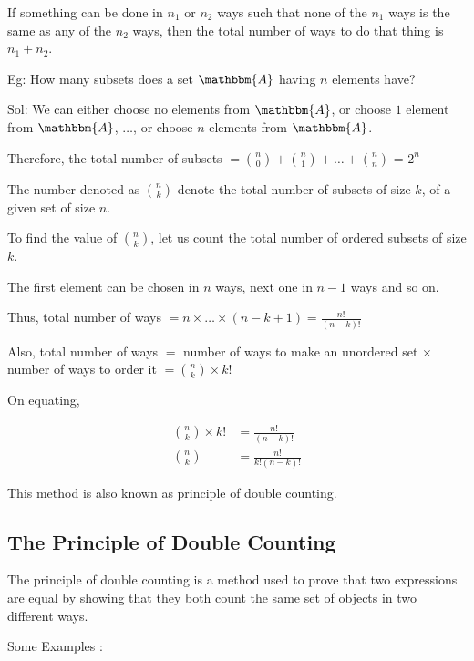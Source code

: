 \documentclass[14pt]{extarticle}
\newcommand{\A}{\mathbbm{A}}
\begin{document}
If something can be done in $n_1$ or $n_2$ ways such that none of the $n_1$ ways is the same as any of the $n_2$ ways, then the total number of ways to do that thing is $n_1 + n_2$.

Eg: How many subsets does a set $\A$ having $n$ elements have?

Sol: We can either choose no elements from $\A$, or choose $1$ element from $\A$, $\dots$, or choose $n$ elements from $\A$.

Therefore, the total number of subsets $= \binom{n}0{} + \binom{n}{1} + \dots + \binom{n}{n}$ = $2^n$

The number denoted as $\binom{n}{k}$ denote the total number of subsets of size $k$, of a given set of size $n$.

To find the value of $\binom{n}{k}$, let us count the total number of ordered subsets of size $k$.

The first element can be chosen in $n$ ways, next one in $n-1$ ways and so on.

Thus, total number of ways $= n \times \dots \times (n-k+1) = \frac{n!}{(n-k)!}$

Also, total number of ways $=$ number of ways to make an unordered set $\times$ number of ways to order it $= \binom{n}{k} \times k!$

On equating,

\begin{align*}
    \binom{n}{k} \times k! &= \frac{n!}{(n-k)!} \\
    \binom{n}{k} &= \frac{n!}{k!(n-k)!}
\end{align*}

This method is also known as principle of double counting.

\subsection{The Principle of Double Counting}

The principle of double counting is a method used to prove that two expressions are equal by showing that they both count the same set of objects in two different ways.

Some Examples :
\end{document}
